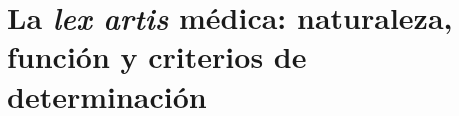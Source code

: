 %
%

\section{La \textit{lex artis} médica: naturaleza, función y criterios de determinación}
\label{sec:lex_artis}

